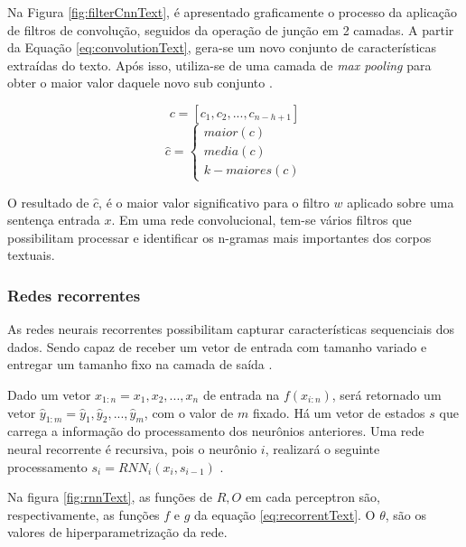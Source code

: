 Na Figura \ref{fig:filterCnnText}, é apresentado graficamente o processo da aplicação de filtros de convolução, seguidos da operação de junção em 2 camadas. A partir da Equação \ref{eq:convolutionText}, gera-se um novo conjunto de características extraídas do texto. Após isso, utiliza-se de uma camada de \textit{max pooling} para obter o maior valor daquele novo sub conjunto \cite{kim_convolutional_2014}.

$$c = [ c_{1}, c_{2}, ..., c_{n-h+1} ]$$
\begin{equation}
	\hat{c} = 
    \begin{cases}
    	maior(c) \\
        media(c) \\
        k-maiores(c) 
    \end{cases}
\end{equation}

O resultado de $\hat{c}$, é o maior valor significativo para o filtro $w$ aplicado sobre uma sentença entrada $x$. Em uma rede convolucional, tem-se vários filtros que possibilitam processar \cite{kim_convolutional_2014} e identificar os n-gramas mais importantes \cite{goldberg_neural_2017} dos corpos textuais.



\subsubsection{Redes recorrentes}

As redes neurais recorrentes possibilitam capturar características sequenciais dos dados. Sendo capaz de receber um vetor de entrada com tamanho variado e entregar um tamanho fixo na camada de saída \cite{goldberg_neural_2017}.

Dado um vetor $x_{1:n} = x_{1}, x_{2}, ..., x_{n}$ de entrada na $f(x_{i:n})$, será retornado um vetor $\hat{y}_{1:m} = \hat{y}_{1}, \hat{y}_{2}, ..., \hat{y}_{m}$, com o valor de $m$ fixado. Há um vetor de estados $s$ que carrega a informação do processamento dos neurônios anteriores. Uma rede neural recorrente é recursiva, pois o neurônio $i$, realizará o seguinte processamento $s_{i} = RNN_{i}(x_{i}, s_{i-1})$ \cite{mikolov_recurrent_2010}.

Na figura \ref{fig:rnnText}, as funções de $R, O$ em cada perceptron são, respectivamente, as funções $f$ e $g$ da equação \ref{eq:recorrentText}. O $\theta$, são os valores de hiperparametrização da rede.

